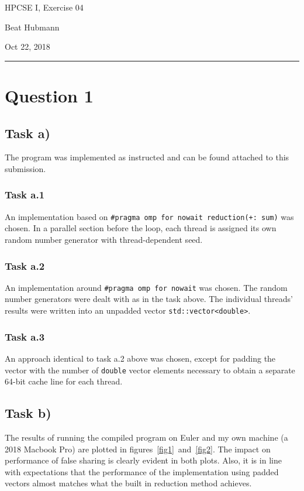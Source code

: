 \documentclass[11pt,a4paper]{article}
\begin{document}
\noindent\parbox{\linewidth}{
 \parbox{.25\linewidth}{ \large HPCSE I, Exercise 04 }\hfill
 \parbox{.5\linewidth}{\begin{center} \large Beat Hubmann \end{center}}\hfill
 \parbox{.2\linewidth}{\begin{flushright} \large Oct 22, 2018 \end{flushright}}
}
\noindent\rule{\linewidth}{2pt}

\section{Question 1}

\subsection{Task a)}

The program was implemented as instructed and can be found attached to this submission.
\subsubsection{Task a.1}
An implementation based on \texttt{\#pragma omp for nowait reduction(+: sum)} was chosen. In a parallel section before the loop, each thread is assigned its own random number generator with thread-dependent seed.

\subsubsection{Task a.2}
An implementation around \texttt{\#pragma omp for nowait} was chosen. The random number generators were dealt with as in the task above. The individual threads' results were written into an unpadded vector \texttt{std::vector<double>}.

\subsubsection{Task a.3}
An approach identical to task a.2 above was chosen, except for padding the vector with the number of \texttt{double} vector elements necessary to obtain a separate 64-bit cache line for each thread.

\subsection{Task b)}
The results of running the compiled program on Euler and my own machine (a 2018 Macbook Pro) are plotted in figures~\ref{fig1}~and~\ref{fig2}. The impact on performance of false sharing is clearly evident in both plots. Also, it is in line with expectations that the performance of the implementation using padded vectors almost matches what the built in reduction method achieves.
\end{document}
